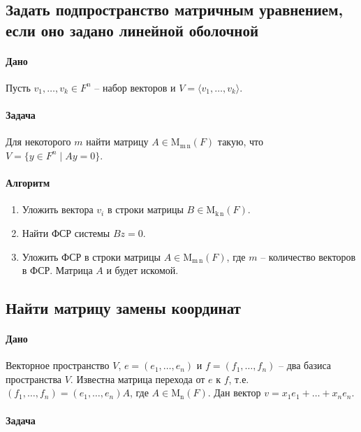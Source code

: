 \documentclass{article}
\newcommand{\MatrixDim}[3]{\operatorname{\mathrm{M}_{#2\,#3}}(#1)}
\newcommand{\Matrix}[2]{\operatorname{\mathrm{M}_{#2}}(#1)}
\begin{document}
\subsection{Задать подпространство матричным уравнением, если оно задано линейной оболочной}

\paragraph{Дано}

Пусть $v_1,\ldots,v_k\in F^{n}$ -- набор векторов и $V = \langle v_1,\ldots,v_k \rangle$.

\paragraph{Задача}

Для некоторого $m$ найти матрицу $A\in\MatrixDim{F}{m}{n}$ такую, что $V = \{y\in F^{n}\mid Ay = 0\}$.

\paragraph{Алгоритм}

\begin{enumerate}
\item Уложить вектора $v_i$ в строки матрицы $B\in \MatrixDim{F}{k}{n}$.

\item Найти ФСР системы $Bz = 0$.

\item Уложить ФСР в строки матрицы $A\in \MatrixDim{F}{m}{n}$, где $m$ -- количество векторов в ФСР.
Матрица $A$ и будет искомой.
\end{enumerate}

\subsection{Найти матрицу замены координат}

\paragraph{Дано}

Векторное пространство $V$, $e=(e_1,\ldots,e_n)$ и $f = (f_1,\ldots,f_n)$ -- два базиса пространства $V$.
Известна матрица перехода от $e$ к $f$, т.е. $(f_1,\ldots,f_n) = (e_1,\ldots,e_n)A$, где $A\in \Matrix{F}{n}$.
Дан вектор $v = x_1e_1+\ldots+x_n e_n$.

\paragraph{Задача}
\end{document}
